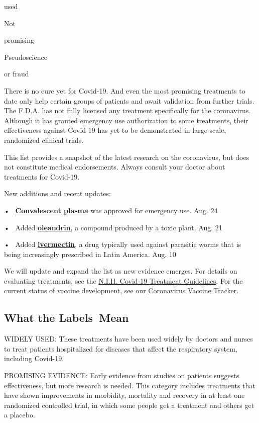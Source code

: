used

Not

promising

Pseudoscience

or fraud

There is no cure yet for Covid-19. And even the most promising
treatments to date only help certain groups of patients and await
validation from further trials. The F.D.A. has not fully licensed any
treatment specifically for the coronavirus. Although it has granted
\href{https://www.fda.gov/emergency-preparedness-and-response/mcm-legal-regulatory-and-policy-framework/emergency-use-authorization}{emergency
use authorization} to some treatments, their effectiveness against
Covid-19 has yet to be demonstrated in large-scale, randomized clinical
trials.

This list provides a snapshot of the latest research on the coronavirus,
but does not constitute medical endorsements. Always consult your doctor
about treatments for Covid-19.

New additions and recent updates:

•~ \textbf{\protect\hyperlink{plasma}{Convalescent plasma}} was approved
for emergency use. Aug. 24

•~ Added \textbf{\protect\hyperlink{oleandrin}{oleandrin}}, a compound
produced by a toxic plant. Aug. 21

•~ Added \textbf{\protect\hyperlink{ivermectin}{ivermectin}}, a drug
typically used against parasitic worms that is being increasingly
prescribed in Latin America. Aug. 10

We will update and expand the list as new evidence emerges. For details
on evaluating treatments, see the
\href{https://www.covid19treatmentguidelines.nih.gov/}{N.I.H. Covid-19
Treatment Guidelines}. For the current status of vaccine development,
see our
\href{https://www.nytimes3xbfgragh.onion/interactive/2020/science/coronavirus-vaccine-tracker.html}{Coronavirus
Vaccine Tracker}.

\hypertarget{what-the-labels-mean}{%
\subsection{What the Labels~Mean}\label{what-the-labels-mean}}

WIDELY USED: These treatments have been used widely by doctors and
nurses to treat patients hospitalized for diseases that affect the
respiratory system, including Covid-19.

PROMISING EVIDENCE: Early evidence from studies on patients suggests
effectiveness, but more research is needed. This category includes
treatments that have shown improvements in morbidity, mortality and
recovery in at least one randomized controlled trial, in which some
people get a treatment and others get a placebo.

